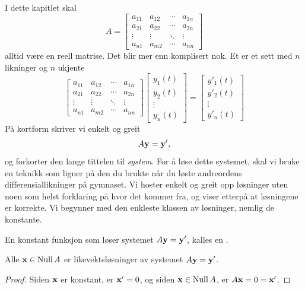 I dette kapitlet skal 
\[
A=
\begin{bmatrix}
a_{11} & a_{12} & \cdots & a_{1n} \\
a_{21} & a_{22} & \cdots & a_{2n} \\
\vdots & \vdots & \ddots & \vdots \\
a_{n1} & a_{m2} & \cdots & a_{nn}
\end{bmatrix}
\]
 alltid være en reell matrise. Det blir mer enn komplisert nok. 
 Et  er et sett med $n$ likninger og $n$ ukjente
\[
\begin{bmatrix}
a_{11} & a_{12} & \cdots & a_{1n} \\
a_{21} & a_{22} & \cdots & a_{2n} \\
\vdots & \vdots & \ddots & \vdots \\
a_{n1} & a_{m2} & \cdots & a_{nn}
\end{bmatrix}
\begin{bmatrix}
y_1(t) \\ y_2(t) \\ \vdots \\ y_n(t)
\end{bmatrix}
=
\begin{bmatrix}
y'_1(t) \\ y'_2(t) \\ \vdots \\ y'_n(t)
\end{bmatrix}
\]
På kortform skriver vi enkelt og greit
\[
A\mathbf{y}=\mathbf{y}',
\]
og forkorter den lange tittelen til \textit{system}. 
For å løse dette systemet, skal vi bruke en teknikk som ligner på den du brukte når du løste andreordens differensiallikninger på gymnaset. 
Vi hoster enkelt og greit opp løsninger uten noen som helst forklaring på hvor det kommer fra, og viser etterpå at løsningene er korrekte. 
Vi begynner med den enkleste klassen av løsninger, nemlig de konstante.

\begin{defnx}
En konstant funksjon som løser systemet $A\mathbf{y}=\mathbf{y}'$, kalles en .
\end{defnx}

\begin{thm}
Alle $\mathbf{x} \in \operatorname{Null} A$ er likevektsløsninger av systemet $A\mathbf{y}=\mathbf{y}'$. 
\end{thm}
\begin{proof}
Siden $\mathbf{x}$ er konstant, er $\mathbf{x}'=0$, og siden  $\mathbf{x} \in \operatorname{Null} A$, er $A\mathbf{x}=0=\mathbf{x}'$.
\end{proof}


